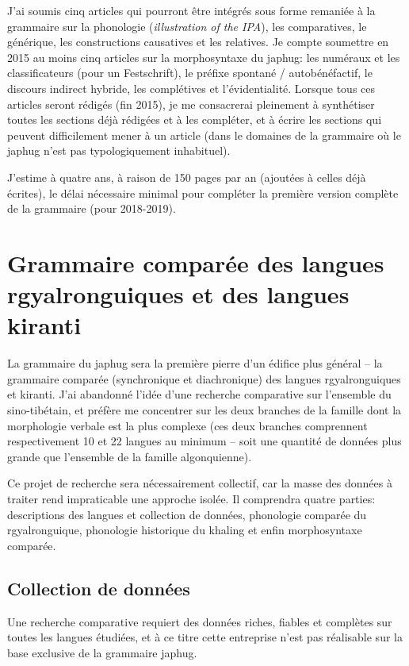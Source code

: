 \documentclass[oldfontcommands,oneside,a4paper,11pt]{article}
\begin{document}
  J'ai soumis cinq articles qui pourront être intégrés sous forme remaniée à la grammaire sur la phonologie (\textit{illustration of the IPA}), les comparatives, le générique, les constructions causatives et les relatives. Je compte soumettre en 2015 au moins cinq articles sur la morphosyntaxe du japhug: les numéraux et les classificateurs (pour un Festschrift), le préfixe spontané / autobénéfactif, le discours indirect hybride, les complétives et l'évidentialité. Lorsque tous ces articles seront rédigés (fin 2015), je me consacrerai pleinement  à synthétiser toutes les sections déjà rédigées et à les compléter, et à écrire les sections qui peuvent difficilement mener à un article (dans le domaines de la grammaire où le japhug n'est pas typologiquement inhabituel).

J'estime à quatre ans, à raison de 150 pages par an (ajoutées à celles déjà écrites), le délai nécessaire minimal pour compléter la première version complète de la grammaire (pour 2018-2019).

\section{Grammaire comparée des langues rgyalronguiques et des langues kiranti}
La grammaire du japhug sera la première pierre d'un édifice plus général -- la grammaire comparée (synchronique et diachronique) des langues rgyalronguiques et kiranti. J'ai abandonné l'idée d'une recherche comparative sur l'ensemble du sino-tibétain, et préfère me concentrer sur les deux branches de la famille dont la morphologie verbale est la plus complexe (ces deux branches comprennent respectivement 10 et 22 langues au minimum -- soit une quantité de données plus grande que l'ensemble de la famille algonquienne).

Ce projet de recherche sera nécessairement collectif, car la masse des données à traiter rend impraticable une approche isolée. Il comprendra quatre parties: descriptions des langues et collection de données, phonologie comparée du rgyalronguique, phonologie historique du khaling et enfin morphosyntaxe comparée.

\subsection{Collection de données}
Une recherche comparative requiert des données riches, fiables et complètes sur toutes les langues étudiées, et à ce titre cette entreprise n'est pas réalisable sur la base exclusive de la grammaire japhug.
\end{document}
